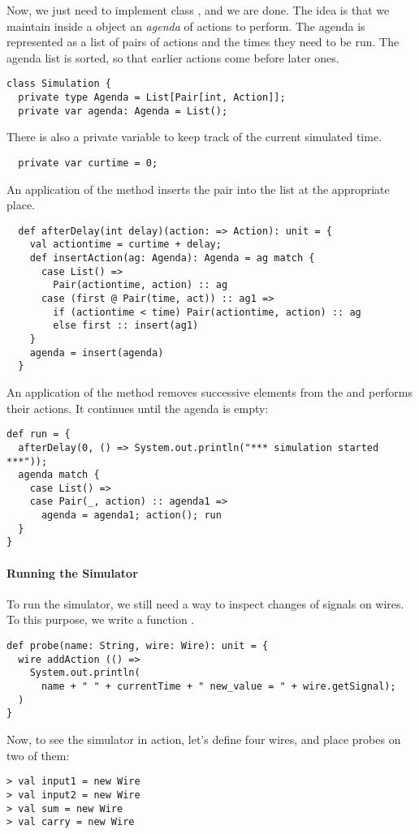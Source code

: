 {Now, we just need to implement class , and we are
done.  The idea is that we maintain inside a  object
an \emph{agenda} of actions to perform.  The agenda is represented as
a list of pairs of actions and the times they need to be run.  The
agenda list is sorted, so that earlier actions come before later ones.
\begin{lstlisting} 
class Simulation {
  private type Agenda = List[Pair[int, Action]];
  private var agenda: Agenda = List();
\end{lstlisting}
There is also a private variable  to keep track of the
current simulated time.
\begin{lstlisting}
  private var curtime = 0;
\end{lstlisting}
An application of the method  
inserts the pair  into the
 list at the appropriate place.
\begin{lstlisting}
  def afterDelay(int delay)(action: => Action): unit = {
    val actiontime = curtime + delay;
    def insertAction(ag: Agenda): Agenda = ag match {
      case List() => 
        Pair(actiontime, action) :: ag
      case (first @ Pair(time, act)) :: ag1 =>
        if (actiontime < time) Pair(actiontime, action) :: ag
        else first :: insert(ag1)
    }
    agenda = insert(agenda)
  }
\end{lstlisting}
An application of the  method removes successive elements
from the  and performs their actions.
It continues until the agenda is empty:
\begin{lstlisting}
def run = {
  afterDelay(0, () => System.out.println("*** simulation started ***"));
  agenda match {
    case List() =>
    case Pair(_, action) :: agenda1 =>
      agenda = agenda1; action(); run
  }
}
\end{lstlisting}


\paragraph{Running the Simulator}
To run the simulator, we still need a way to inspect changes of
signals on wires. To this purpose, we write a function .
\begin{lstlisting}
def probe(name: String, wire: Wire): unit = {
  wire addAction (() =>
    System.out.println(
      name + " " + currentTime + " new_value = " + wire.getSignal);
  )
}
\end{lstlisting}
Now, to see the simulator in action, let's define four wires, and place
probes on two of them: 
\begin{lstlisting}
> val input1 = new Wire
> val input2 = new Wire
> val sum = new Wire
> val carry = new Wire


\end{lstlisting}}
